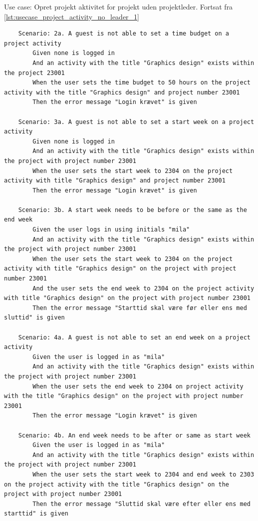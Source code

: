 \begin{listing}
    \centering
    \caption{Use case: Opret projekt aktivitet for projekt uden projektleder. Fortsat fra \cref{lst:usecase_project_activity_no_leader_1}}\label{lst:usecase_project_activity_no_leader_2}
    \begin{verbatim}
    Scenario: 2a. A guest is not able to set a time budget on a project activity
        Given none is logged in
        And an activity with the title "Graphics design" exists within the project 23001
        When the user sets the time budget to 50 hours on the project activity with the title "Graphics design" and project number 23001
        Then the error message "Login krævet" is given
    
    Scenario: 3a. A guest is not able to set a start week on a project activity
        Given none is logged in
        And an activity with the title "Graphics design" exists within the project with project number 23001
        When the user sets the start week to 2304 on the project activity with title "Graphics design" and project number 23001
        Then the error message "Login krævet" is given
    
    Scenario: 3b. A start week needs to be before or the same as the end week
        Given the user logs in using initials "mila"
        And an activity with the title "Graphics design" exists within the project with project number 23001
        When the user sets the start week to 2304 on the project activity with title "Graphics design" on the project with project number 23001
        And the user sets the end week to 2304 on the project activity with title "Graphics design" on the project with project number 23001
        Then the error message "Starttid skal være før eller ens med sluttid" is given
    
    Scenario: 4a. A guest is not able to set an end week on a project activity
        Given the user is logged in as "mila"
        And an activity with the title "Graphics design" exists within the project with project number 23001
        When the user sets the end week to 2304 on project activity with the title "Graphics design" on the project with project number 23001
        Then the error message "Login krævet" is given
    
    Scenario: 4b. An end week needs to be after or same as start week
        Given the user is logged in as "mila"
        And an activity with the title "Graphics design" exists within the project with project number 23001
        When the user sets the start week to 2304 and end week to 2303 on the project activity with the title "Graphics design" on the project with project number 23001
        Then the error message "Sluttid skal være efter eller ens med starttid" is given
    \end{verbatim}
\end{listing}\clearpage
